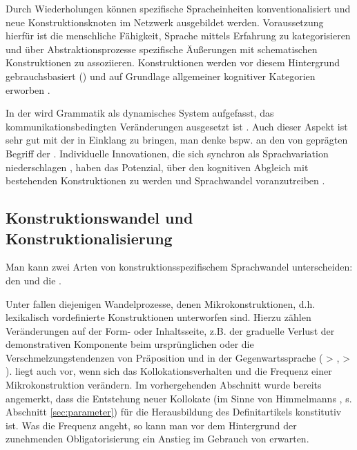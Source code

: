 Durch Wiederholungen können spezifische Spracheinheiten konventionalisiert und neue Konstruktionsknoten im Netzwerk  ausgebildet werden. Voraussetzung hierfür ist die menschliche Fähigkeit, Sprache mittels Erfahrung zu kategorisieren und über Abstraktionsprozesse spezifische Äußerungen mit schematischen Konstruktionen   zu assoziieren. Konstruktionen werden vor diesem Hintergrund gebrauchsbasiert () und auf Grundlage allgemeiner kognitiver Kategorien erworben \parencite[u.a.][]{Langacker1987,Goldberg2006,Bybee2006,Bybee2010,Bybee2013}.

In der  wird Grammatik als dynamisches System aufgefasst, das kommunikationsbedingten Veränderungen ausgesetzt ist \parencite[35--36]{Imo2007}. Auch dieser Aspekt ist sehr gut mit der  in Einklang zu bringen, man denke bspw. an den von  \textcite{Hopper1991} geprägten Begriff der . Individuelle Innovationen, die sich synchron als Sprachvariation niederschlagen \parencite{Croft2010}, haben das Potenzial, über den kognitiven Abgleich mit bestehenden Konstruktionen  zu werden und Sprachwandel voranzutreiben \parencite[66]{Langacker1987}. 

\subsection{Konstruktionswandel und Konstruktionalisierung}\label{sec:konstruktionalisierung}

Man kann zwei Arten von konstruktionsspezifischem Sprachwandel unterscheiden: den  und die  \parencite[vgl.][]{Hilpert2011,Hilpert2013,Fried2013,Traugott2013,Traugott2015,Trousdale2014}. 

Unter  fallen diejenigen Wandelprozesse, denen Mikrokonstruktionen, d.h. lexikalisch vordefinierte Konstruktionen  unterworfen sind. Hierzu zählen Veränderungen auf der Form- oder Inhaltsseite, z.B. der graduelle Verlust der demonstrativen Komponente beim ursprünglichen   oder die Verschmelzungstendenzen von Präposition und  in der Gegenwartssprache ( > ,  > ).  liegt auch vor, wenn sich das Kollokationsverhalten und die Frequenz einer Mikrokonstruktion  verändern. Im vorhergehenden Abschnitt wurde bereits angemerkt, dass die Entstehung neuer Kollokate (im Sinne von Himmelmanns  , s. Abschnitt \ref{sec:parameter}) für die Herausbildung des Definitartikels konstitutiv ist. Was die Frequenz angeht, so kann man vor dem Hintergrund der zunehmenden Obligatorisierung ein Anstieg im Gebrauch von  erwarten. 

